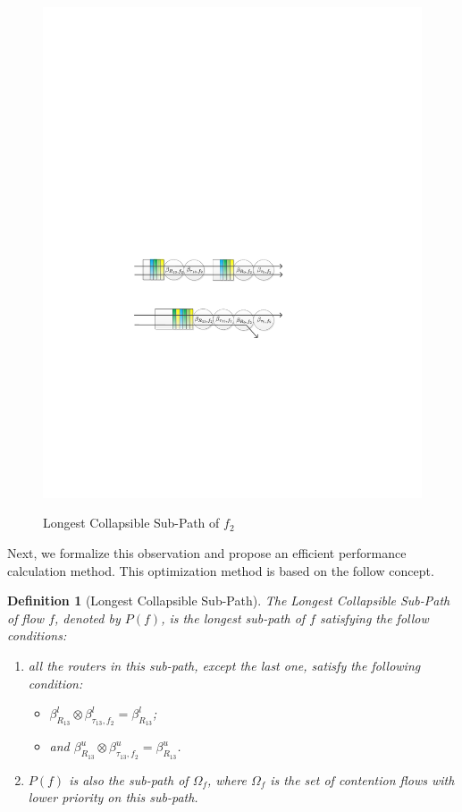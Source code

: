 \documentclass[10pt,journal]{IEEEtran}
\newtheorem{definition}{Definition}
\begin{document}
\begin{figure}
  \centering
  \includegraphics[scale=0.6]{figures/collapse.pdf}\\
  \caption{Longest Collapsible Sub-Path of $f_2$}\label{collapse}
\end{figure}

Next, we formalize this observation and propose an efficient performance calculation method. This optimization method is based on the follow concept.
\begin{definition}[Longest Collapsible Sub-Path]
The Longest Collapsible Sub-Path of flow $f$, denoted by $P(f)$, is the longest sub-path of $f$ satisfying the follow conditions:
\begin{enumerate}
  \item all the routers in this sub-path, except the last one, satisfy the following condition:
      \begin{itemize}
        \item $\beta_{R_{13}}^l\otimes\beta_{\tau_{13},f_2}^l=\beta_{R_{13}}^l$;
        \item and $\beta_{R_{13}}^u\otimes\beta_{\tau_{13},f_2}^u=\beta_{R_{13}}^u$.
      \end{itemize}
  \item $P(f)$ is also the sub-path of $\Omega_{f}$, where $\Omega_{f}$ is the set of contention flows with lower priority on this sub-path.
\end{enumerate}
\end{definition}
\end{document}
